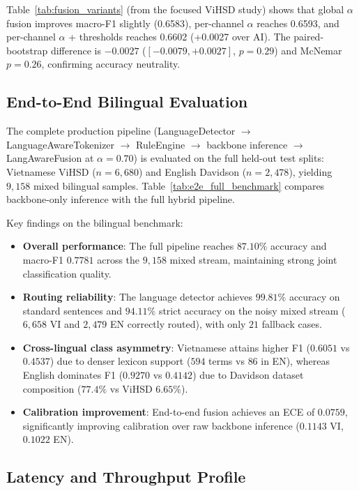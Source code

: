 Table~\ref{tab:fusion_variants} (from the focused ViHSD study) shows that global
$\alpha$ fusion improves macro-F1 slightly (0.6583), per-channel $\alpha$ reaches
0.6593, and per-channel $\alpha$ + thresholds reaches 0.6602 (+0.0027 over AI).
The paired-bootstrap difference is $-0.0027$ ($[-0.0079, +0.0027]$, $p=0.29$) and
McNemar $p=0.26$, confirming accuracy neutrality.



\subsection{End-to-End Bilingual Evaluation}
\label{sec:e2e}

The complete production pipeline (LanguageDetector $\to$ LanguageAwareTokenizer $\to$
RuleEngine $\to$ backbone inference $\to$ LangAwareFusion at $\alpha=0.70$) is evaluated
on the full held-out test splits: Vietnamese ViHSD ($n=6{,}680$) and English Davidson ($n=2{,}478$),
yielding $9{,}158$ mixed bilingual samples. Table~\ref{tab:e2e_full_benchmark} compares
backbone-only inference with the full hybrid pipeline.

Key findings on the bilingual benchmark:
\begin{itemize}
    \item \textbf{Overall performance}: The full pipeline reaches $87.10\%$ accuracy and macro-F1 $0.7781$ across the $9{,}158$ mixed stream, maintaining strong joint classification quality.
    \item \textbf{Routing reliability}: The language detector achieves $99.81\%$ accuracy on standard sentences and $94.11\%$ strict accuracy on the noisy mixed stream ($6{,}658$ VI and $2{,}479$ EN correctly routed), with only $21$ fallback cases.
    \item \textbf{Cross-lingual class asymmetry}: Vietnamese attains higher \hate{} F1 ($0.6051$ vs $0.4537$) due to denser lexicon support ($594$ \hate{} terms vs $86$ in EN), whereas English dominates \off{} F1 ($0.9270$ vs $0.4142$) due to Davidson dataset composition ($77.4\%$ \off{} vs ViHSD $6.65\%$).
    \item \textbf{Calibration improvement}: End-to-end fusion achieves an ECE of $0.0759$, significantly improving calibration over raw backbone inference ($0.1143$ VI, $0.1022$ EN).
\end{itemize}



\subsection{Latency and Throughput Profile}
\label{sec:latency}

